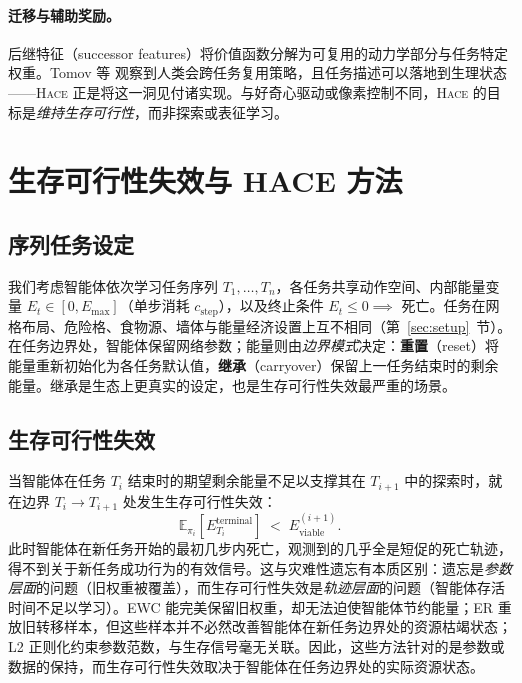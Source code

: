\documentclass[zihao=5,a4paper,linespread=1.3,fontset=fandol]{ctexart}
\newcommand{\energy}{E}
\newcommand{\hace}{\textsc{Hace}}
\begin{document}
\paragraph{迁移与辅助奖励。}
后继特征（successor features）\cite{Barreto}将价值函数分解为可复用的动力学部分与任务特定权重。Tomov 等\cite{Tomov} 观察到人类会跨任务复用策略，且任务描述可以落地到生理状态——\hace{} 正是将这一洞见付诸实现。与好奇心驱动\cite{pathak2017}或像素控制\cite{jaderberg2017}不同，\hace{} 的目标是\emph{维持生存可行性}，而非探索或表征学习。

\section{生存可行性失效与 HACE 方法}
\label{sec:method}

\subsection{序列任务设定}

我们考虑智能体依次学习任务序列 $T_1, \ldots, T_n$，各任务共享动作空间、内部能量变量 $\energy_t \in [0, \energy_{\max}]$（单步消耗 $c_{\text{step}}$），以及终止条件 $\energy_t \leq 0 \implies$ 死亡。任务在网格布局、危险格、食物源、墙体与能量经济设置上互不相同（第~\ref{sec:setup}~节）。在任务边界处，智能体保留网络参数；能量则由\emph{边界模式}决定：\textbf{重置}（reset）将能量重新初始化为各任务默认值，\textbf{继承}（carryover）保留上一任务结束时的剩余能量。继承是生态上更真实的设定，也是生存可行性失效最严重的场景。

\subsection{生存可行性失效}

当智能体在任务 $T_i$ 结束时的期望剩余能量不足以支撑其在 $T_{i+1}$ 中的探索时，就在边界 $T_i \to T_{i+1}$ 处发生生存可行性失效：
\begin{equation}
  \mathbb{E}_{\pi_i}\!\left[\energy_{T_i}^{\text{terminal}}\right]
  \;<\; \energy_{\text{viable}}^{(i+1)}.
\end{equation}
此时智能体在新任务开始的最初几步内死亡，观测到的几乎全是短促的死亡轨迹，得不到关于新任务成功行为的有效信号。这与灾难性遗忘有本质区别：遗忘是\emph{参数层面}的问题（旧权重被覆盖），而生存可行性失效是\emph{轨迹层面}的问题（智能体存活时间不足以学习）。EWC 能完美保留旧权重，却无法迫使智能体节约能量；ER 重放旧转移样本，但这些样本并不必然改善智能体在新任务边界处的资源枯竭状态；L2 正则化约束参数范数，与生存信号毫无关联。因此，这些方法针对的是参数或数据的保持，而生存可行性失效取决于智能体在任务边界处的实际资源状态。
\end{document}
